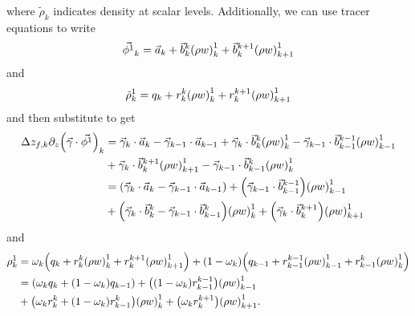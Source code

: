 \documentclass[11pt]{article}
\begin{document}
where $\tilde{\rho}_k$ indicates density at scalar levels. Additionally, we can use tracer equations to write
\begin{equation*}
\vec{\phi^1}_{k} = \vec{a}_{k} + \vec{b}^k_k \qty(\rho w)^1_k + \vec{b}^{k+1}_k \qty(\rho w)^1_{k+1}
\end{equation*}
and
\begin{equation*}
\tilde{\rho}^1_k = q_{k} + r^{k}_k \qty(\rho w)^1_{k} + r^{k+1}_k \qty(\rho w)^1_{k+1}
\end{equation*}
and then substitute to get
\begin{align*}
\Delta z_{f,k} \partial_z \qty (\vec{\gamma} \cdot \vec{\phi^1})_k &= \vec{\gamma}_k \cdot \vec{a}_k - \vec{\gamma}_{k-1} \cdot \vec{a}_{k-1} + \vec{\gamma}_k \cdot \vec{b}^{k}_{k} \qty(\rho w)^1_k - \vec{\gamma}_{k-1} \cdot \vec{b}^{k-1}_{k-1} \qty(\rho w)^1_{k-1} \\
&+ \vec{\gamma}_k \cdot \vec{b}^{k+1}_{k} \qty(\rho w)^1_{k+1} - \vec{\gamma}_{k-1} \cdot \vec{b}^{k}_{k-1} \qty(\rho w)^1_{k} \\
&= \qty(\vec{\gamma}_k \cdot \vec{a}_k - \vec{\gamma}_{k-1} \cdot \vec{a}_{k-1}) + \qty(\vec{\gamma}_{k-1} \cdot \vec{b}^{k-1}_{k-1}) \qty(\rho w)^1_{k-1} \\
&+ \qty(\vec{\gamma}_k \cdot \vec{b}^{k}_{k} - \vec{\gamma}_{k-1} \cdot \vec{b}^{k}_{k-1}) \qty(\rho w)^1_{k} + \qty(\vec{\gamma}_k \cdot \vec{b}^{k+1}_{k}) \qty(\rho w)^1_{k+1}
\end{align*}
and
\begin{align*}
\rho^1_k &= \omega_k \qty(q_k + r^k_k \qty(\rho w)^1_k + r^{k+1}_k \qty(\rho w)^1_{k+1}) + \qty(1 - \omega_k) \qty(q_{k-1} + r^{k-1}_{k-1} \qty(\rho w)^1_{k-1} + r^{k}_{k-1} \qty(\rho w)^1_{k}) \\
&= \qty(\omega_k q_k + \qty(1 - \omega_k) q_{k-1}) + \qty(\qty(1 - \omega_k)r^{k-1}_{k-1}) \qty(\rho w)^1_{k-1} \\
&+ \qty(\omega_k r^k_k + \qty(1 - \omega_k) r^k_{k-1}) \qty(\rho w)^1_{k} + \qty(\omega_k r^{k+1}_k) \qty(\rho w)^1_{k+1}.
\end{align*}
\end{document}
